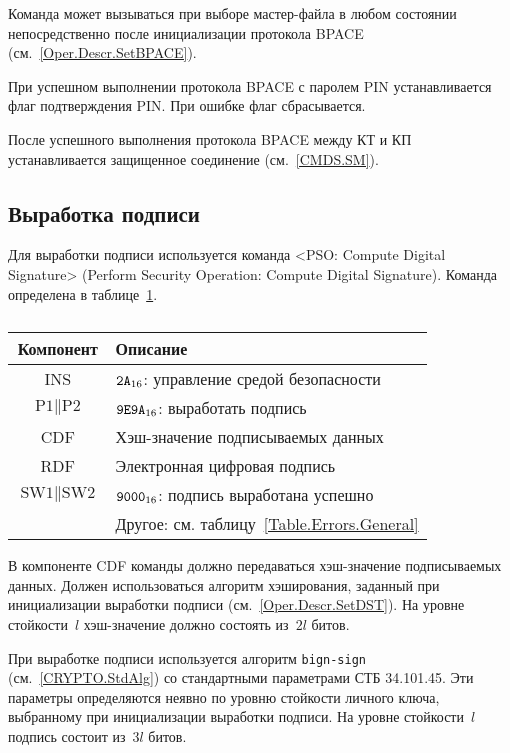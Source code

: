 Команда может вызываться при выборе мастер-файла в любом состоянии
непосредственно после инициализации протокола BPACE 
(см.~\ref{Oper.Descr.SetBPACE}). 

При успешном выполнении протокола BPACE с паролем PIN 
устанавливается флаг подтверждения PIN.
При ошибке флаг сбрасывается.

После успешного выполнения протокола BPACE между КТ и КП 
устанавливается защищенное соединение (см.~\ref{CMDS.SM}).

\subsection{Выработка подписи}
\label{Oper.Descr.Signature}

Для выработки подписи используется 
команда <PSO: Compute Digital Signature>
(Perform Security Operation: Compute Digital Signature).
Команда определена в таблице~\ref{Table.Oper.SignatureCmd}.

\begin{table}[hbt]
\caption{}\label{Table.Oper.SignatureCmd}
\begin{tabular}{|c|p{14cm}|}
\hline
Компонент & Описание\\ 
\hline
\hline
INS & $\texttt{2A}_{16}$: управление средой безопасности \\
\hline
$\text{P1} \parallel \text{P2}$ & $\texttt{9E9A}_{16}$: выработать подпись\\ 
\hline
CDF & Хэш-значение подписываемых данных\\
\hline 
\hline
RDF & Электронная цифровая подпись\\
\hline
$\text{SW1} \parallel \text{SW2}$ & 
  $\texttt{9000}_{16}$: подпись выработана успешно \\
\cline{2-2}
  & Другое: см. таблицу~\ref{Table.Errors.General} \\
\hline
\end{tabular}
\end{table}

В компоненте CDF команды должно передаваться хэш-значение подписываемых данных.
Должен использоваться алгоритм хэширования, заданный при инициализации 
выработки подписи (см.~\ref{Oper.Descr.SetDST}). 
%
На уровне стойкости~$l$ хэш-значение должно состоять из~$2l$ битов.

При выработке подписи используется алгоритм \texttt{bign-sign}
(см.~\ref{CRYPTO.StdAlg}) со стандартными параметрами СТБ 34.101.45.
Эти параметры определяются неявно по уровню стойкости личного ключа,
выбранному при инициализации выработки подписи.
%
На уровне стойкости~$l$ подпись состоит из~$3l$ битов.

